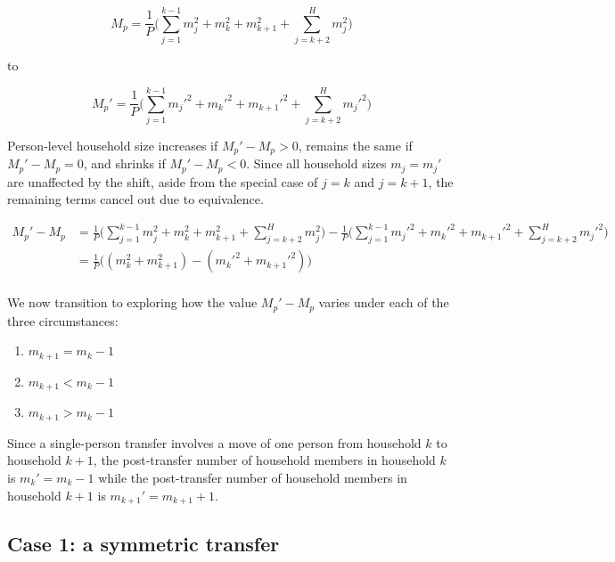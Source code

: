 \documentclass[
]{article}
\providecommand{\tightlist}{%
  \setlength{\itemsep}{0pt}\setlength{\parskip}{0pt}}
\begin{document}
\begin{equation}
M_p =\frac{1}{P} \bigg( \sum_{j = 1}^{k-1} m_j^2 + m_k^2 + m_{k+1}^2 +  \sum_{j = k+2}^{H}m_j^2 \bigg)
\end{equation}

to

\begin{equation}
M_p' =\frac{1}{P} \bigg( \sum_{j = 1}^{k-1} m_j'^2 + m_k'^2 + m_{k+1}'^2 + \sum_{j = k+2}^{H}m_j'^2 \bigg)
\end{equation}

Person-level household size increases if \(M_p' - M_p > 0\), remains the
same if \(M_p' - M_p = 0\), and shrinks if \(M_p' - M_p < 0\). Since all
household sizes \(m_j = m_j'\) are unaffected by the shift, aside from
the special case of \(j = k\) and \(j = k+1\), the remaining terms
cancel out due to equivalence.

\begin{align}
M_p' - M_p & = \frac{1}{P} \bigg( \sum_{j = 1}^{k-1} m_j^2 + m_k^2 + m_{k+1}^2 +  \sum_{j = k+2}^{H}m_j^2 \bigg) - \frac{1}{P} \bigg( \sum_{j = 1}^{k-1} m_j'^2 + m_k'^2 + m_{k+1}'^2 + \sum_{j = k+2}^{H}m_j'^2 \bigg) \\
\label{eq:3}
\tag{3}
& = \frac{1}{P} \bigg( (m_k^2 + m_{k+1}^2) - (m_k'^2 + m_{k+1}'^2) \bigg) \\
\end{align}

We now transition to exploring how the value \(M_p' - M_p\) varies under
each of the three circumstances:

\begin{enumerate}
\def\labelenumi{\arabic{enumi}.}
\tightlist
\item
  \(m_{k+1} = m_k - 1\)
\item
  \(m_{k+1} < m_k - 1\)
\item
  \(m_{k+1} > m_k - 1\)
\end{enumerate}

Since a single-person transfer involves a move of one person from
household \(k\) to household \(k+1\), the post-transfer number of
household members in household \(k\) is \(m_k' = m_k - 1\) while the
post-transfer number of household members in household \(k+1\) is
\(m_{k+1}' = m_{k+1} + 1\).

\hypertarget{case-1-a-symmetric-transfer}{%
\subsection{Case 1: a symmetric
transfer}\label{case-1-a-symmetric-transfer}}
\end{document}
